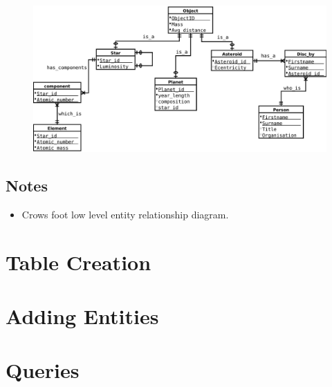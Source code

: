 \documentclass[11pt]{article} %
\begin{document}
\begin{figure}[h]
	\centering
	\includegraphics[width=1.0\textwidth]{ERD-low-CF.pdf}
\end{figure}

\subsection{Notes}

\begin{itemize}
	\item Crows foot low level entity relationship diagram.
\end{itemize}



\newpage
\section{Table Creation}




\section{Adding Entities}




\section{Queries}



\end{document}
